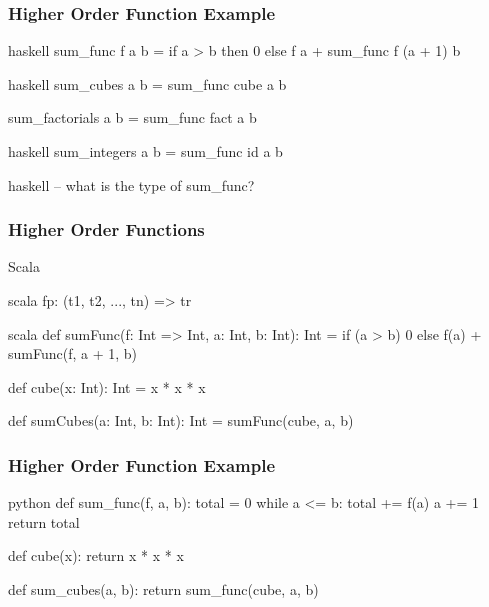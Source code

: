 \documentclass[dvipsnames]{beamer}
\theoremstyle{plain}
\begin{document}
\begin{frame}[fragile]
  \frametitle{Higher Order Function Example}

  \begin{example}[Haskell]
    \pause
    \begin{pygments}{haskell}
sum_func f a b =
    if a > b then 0 else f a + sum_func f (a + 1) b
    \end{pygments}

    \pause
    \bigskip
    \begin{pygments}{haskell}
sum_cubes a b = sum_func cube a b

sum_factorials a b = sum_func fact a b
    \end{pygments}

    \pause
    \smallskip
    \begin{pygments}{haskell}
sum_integers a b = sum_func id a b
    \end{pygments}

    \pause
    \smallskip
    \begin{pygments}{haskell}
-- what is the type of sum_func?
    \end{pygments}
  \end{example}
\end{frame}

\begin{frame}[fragile]
  \frametitle{Higher Order Functions}

  \begin{block}{Scala}
    \begin{pygments}{scala}
      fp: (t1, t2, ..., tn) => tr
    \end{pygments}
  \end{block}

  \pause
  \begin{example}[Scala]
    \pause
    \begin{pygments}{scala}
def sumFunc(f: Int => Int, a: Int, b: Int): Int =
    if (a > b) 0
    else f(a) + sumFunc(f, a + 1, b)

def cube(x: Int): Int = x * x * x

def sumCubes(a: Int, b: Int): Int = sumFunc(cube, a, b)
    \end{pygments}
  \end{example}
\end{frame}

\begin{frame}[fragile]
  \frametitle{Higher Order Function Example}

  \begin{example}[Python]
    \begin{pygments}{python}
def sum_func(f, a, b):
    total = 0
    while a <= b:
        total += f(a)
        a += 1
    return total

def cube(x):
    return x * x * x

def sum_cubes(a, b):
    return sum_func(cube, a, b)
    \end{pygments}
  \end{example}
\end{frame}
\end{document}
